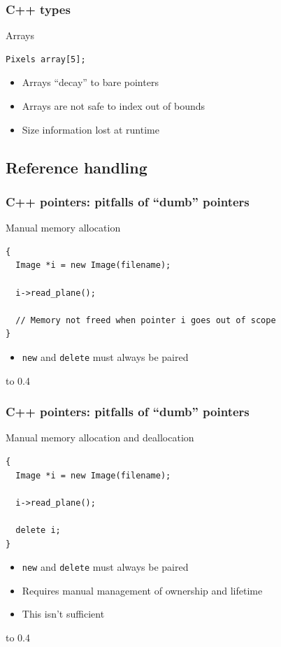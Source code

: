 \documentclass[handout]{beamer}
\begin{document}
\begin{frame}[fragile]
  \frametitle{C++ types}
  \begin{block}{Arrays}
  \begin{lstlisting}
Pixels array[5];
\end{lstlisting}
  \begin{itemize}
    \pause
  \item Arrays “decay” to bare pointers
    \pause
  \item Arrays are not safe to index out of bounds
    \pause
  \item Size information lost at runtime
  \end{itemize}
  \end{block}
\end{frame}

\subsection{Reference handling}

\begin{frame}[fragile]
  \frametitle{C++ pointers: pitfalls of “dumb” pointers}
\begin{block}{Manual memory allocation}
  \begin{lstlisting}
{
  Image *i = new Image(filename);

  i->read_plane();

  // Memory not freed when pointer i goes out of scope
}
\end{lstlisting}
  \begin{itemize}
    \pause
  \item \texttt{new} and \texttt{delete} must always be paired
  \end{itemize}
\end{block}
\vbox to 0.4\textheight{%
}%
\end{frame}

\begin{frame}[fragile]
  \frametitle{C++ pointers: pitfalls of “dumb” pointers}
\begin{block}{Manual memory allocation and deallocation}
  \begin{lstlisting}
{
  Image *i = new Image(filename);

  i->read_plane();

  delete i;
}
\end{lstlisting}
  \begin{itemize}
  \item \texttt{new} and \texttt{delete} must always be paired
  \item Requires manual management of ownership and lifetime
    \pause
  \item This isn't sufficient
  \end{itemize}
\end{block}
\vbox to 0.4\textheight{%
}%
\end{frame}
\end{document}
